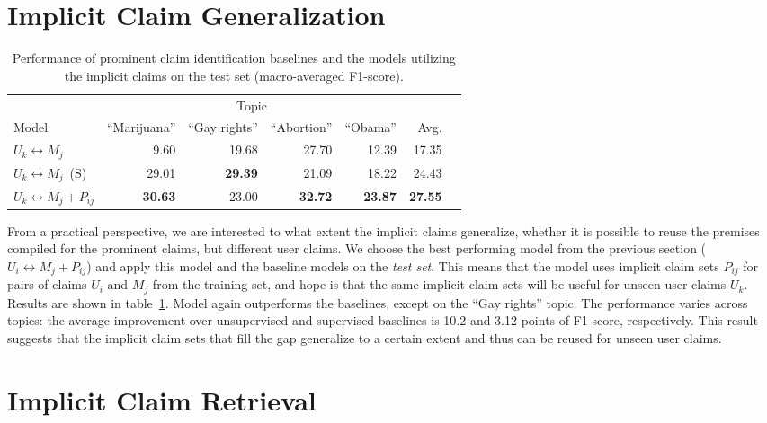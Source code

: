 \section{Implicit Claim Generalization}

\begin{table}[t]
\begin{center}
{\small
\setlength{\tabcolsep}{5.9pt}
\begin{tabular}{lrrrrrr}
\toprule
&\multicolumn{4}{c}{Topic}\\
\cmidrule(lr){2-5}
Model & ``Marijuana'' & ``Gay rights''  & ``Abortion'' & ``Obama'' & Avg. \\
\midrule
$U_k \leftrightarrow M_j$   & 9.60          & 19.68        & 27.70        & 12.39        & 17.35 \\
$U_k \leftrightarrow M_j$\ (S)   & 29.01         & {\bf 29.39}  & 21.09        & 18.22        & 24.43 \\
$U_k \leftrightarrow M_j + P_{ij}$  & {\bf 30.63}   & 23.00        & {\bf 32.72}  & {\bf 23.87}  & {\bf 27.55} \\
\bottomrule
\end{tabular}}
\caption{Performance of prominent claim identification baselines and the models utilizing the
implicit claims on the test set (macro-averaged F1-score).}
\label{tab:argpremise_generalization}
\end{center}
\end{table}

From a practical perspective, we are interested to what extent the implicit claims
generalize, whether it is possible to reuse the premises compiled for the
prominent claims, but different user claims. 
We choose the best performing model from the previous section ($U_i
\leftrightarrow M_j + P_{ij}$)
and apply this model and the baseline models on the \emph{test set}. 
This means that the model uses implicit claim sets $P_{ij}$ for pairs of claims
$U_i$ and $M_j$ from the training set, and hope is that the same implicit claim
sets will be useful for unseen user claims $U_k$. 
Results are shown in table~\ref{tab:argpremise_generalization}. 
Model again outperforms the baselines, except on the ``Gay rights'' topic. 
The performance varies across topics: the average improvement over unsupervised
and supervised baselines is 10.2 and 3.12 points of F1-score, respectively. 
This result suggests that the implicit claim sets that fill the gap generalize to a certain
extent and thus can be reused for unseen user claims. 

\section{Implicit Claim Retrieval}

